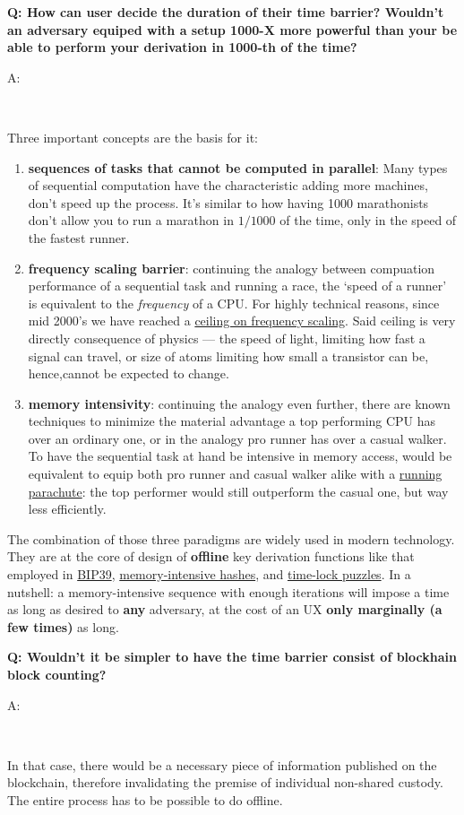 \documentclass[12pt,a4paper]{article}
\newenvironment{question}[1]{%
  \vspace{0.8em}\noindent\textbf{Q: #1}\par
  \vspace{0.2em}\noindent\begin{itshape}A:\end{itshape}~%
}{\vspace{0.8em}}
\newcommand{\mhh}{https://security.stackexchange.com/questions/237498/how-does-memory-hard-hashing-passwords-protect-against-brute-force-attacks\#237511}
\newcommand{\bipref}{https://github.com/bitcoin/bips/blob/master/bip-0039.mediawiki}
\newcommand{\tlp}{https://en.wikipedia.org/wiki/Time-lock_puzzle}
\begin{document}
\begin{question}{How can user decide the duration of their time barrier? Wouldn't an adversary equiped with a setup 1000-X more powerful than your be able to perform your derivation in 1000-th of the time?}
Three important concepts are the basis for it:
\begin{enumerate}
 \item \textbf{sequences of tasks that cannot be computed in parallel}: Many types of sequential computation have the characteristic adding more machines, don't speed up the process. It's similar to how having 1000 marathonists don't allow you to run a marathon in $1/1000$ of the time, only in the speed of the fastest runner.
 \item \textbf{frequency scaling barrier}: continuing the analogy between compuation performance of a sequential task and running a race, the `speed of a runner' is equivalent to the \textit{frequency} of a CPU. For highly technical reasons, since mid 2000's we have reached a \href{https://en.wikipedia.org/wiki/Frequency_scaling}{ceiling on frequency scaling}. Said ceiling is very directly consequence of physics --- the speed of light, limiting how fast a signal can travel, or size of atoms limiting how small a transistor can be, hence,cannot be expected to change.
 \item \textbf{memory intensivity}: continuing the analogy even further, there are known techniques to minimize the material advantage a top performing CPU has over an ordinary one, or in the analogy pro runner has over a casual walker. To have the sequential task at hand be intensive in memory access, would be equivalent to equip both pro runner and casual walker alike with a \href{https://duckduckgo.com/?q=running+parachute&iar=images&t=brave}{running parachute}: the top performer would still outperform the casual one, but way less efficiently.
\end{enumerate}
The combination of those three paradigms are widely used in modern technology. They are at the core of design of \textbf{offline} key derivation functions like that employed in \href{\bipref}{BIP39}, \href{\mhh}{memory-intensive hashes}, and \href{\tlp}{time-lock puzzles}. In a nutshell: a memory-intensive sequence with enough iterations will impose a time as long as desired to \textbf{any} adversary, at the cost of an UX \textbf{only marginally (a few times)} as long.
\end{question}

\begin{question}{Wouldn't it be simpler to have the time barrier consist of blockhain block counting?}
In that case, there would be a necessary piece of information published on the blockchain, therefore invalidating the premise of individual non-shared custody. The entire process has to be possible to do offline.
\end{question}
\end{document}
